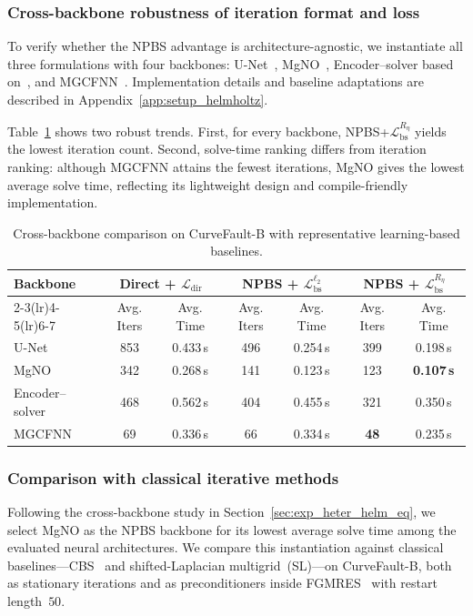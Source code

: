 \documentclass{article}
\theoremstyle{plain}
\theoremstyle{remark}
\begin{document}
\subsubsection{Cross-backbone robustness of iteration format and loss}
To verify whether the NPBS advantage is architecture-agnostic, we instantiate all three formulations with four backbones: U-Net~\cite{ronneberger2015u}, MgNO~\cite{he2024mgno}, Encoder--solver based on~\cite{lerer2024multigrid}, and MGCFNN~\cite{xie2025mgcfnn}.  
Implementation details and baseline adaptations are described in Appendix~\ref{app:setup_helmholtz}.

Table~\ref{tab:learning_baselines} shows two robust trends. First, for every backbone, NPBS+$\mathcal{L}_{\mathrm{bs}}^{R_\eta}$ yields the lowest iteration count. Second, solve-time ranking differs from iteration ranking: although MGCFNN attains the fewest iterations, MgNO gives the lowest average solve time, reflecting its lightweight design and compile-friendly implementation.

\begin{table}[htbp]
\centering
\caption{Cross-backbone comparison on CurveFault-B with representative learning-based baselines.}
\label{tab:learning_baselines}
\begin{tabular}{lcccccc}
\toprule
\multirow{2}{*}{Backbone} & \multicolumn{2}{c}{Direct + $\mathcal{L}_{\mathrm{dir}}$} & \multicolumn{2}{c}{NPBS + $\mathcal{L}_{\mathrm{bs}}^{\ell_2}$} & \multicolumn{2}{c}{NPBS + $\mathcal{L}_{\mathrm{bs}}^{R_\eta}$} \\
\cmidrule(lr){2-3}\cmidrule(lr){4-5}\cmidrule(lr){6-7}
& Avg. Iters & Avg. Time & Avg. Iters & Avg. Time & Avg. Iters & Avg. Time \\
\midrule
U-Net & 853 & 0.433\,s & 496 & 0.254\,s & 399 & 0.198\,s \\
MgNO & 342 & 0.268\,s & 141 & 0.123\,s & 123 & \textbf{0.107\,s} \\
Encoder--solver & 468 & 0.562\,s & 404 & 0.455\,s & 321 & 0.350\,s \\
MGCFNN & 69 & 0.336\,s & 66 & 0.334\,s & \textbf{48} & 0.235\,s \\
\bottomrule
\end{tabular}
\end{table}

\subsubsection{Comparison with classical iterative methods}
Following the cross-backbone study in Section~\ref{sec:exp_heter_helm_eq}, we select MgNO as the NPBS backbone for its lowest average solve time among the evaluated neural architectures. We compare this instantiation against classical baselines---CBS~\cite{osnabrugge2016convergent} and shifted-Laplacian multigrid~\cite{erlangga2006novel}(SL)---on CurveFault-B, both as stationary iterations and as preconditioners inside FGMRES~\cite{saad1993flexible} with restart length~$50$.
\end{document}
